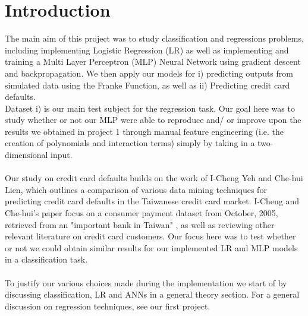 \documentclass[10pt, a4paper, twocolumn]{article}
\begin{document}

\twocolumn[
\begin{@twocolumnfalse}
	\maketitle
	\begin{abstract}
		\abstractText
		\newline
		\newline
	\end{abstract}
\end{@twocolumnfalse}
]


\section{Introduction}
	The main aim of this project was to study classification and regressions problems, including implementing Logistic Regression (LR) as well as implementing and training a Multi Layer Perceptron (MLP) Neural Network using gradient descent and backpropagation. We then apply our models for i) predicting outputs from simulated data using the Franke Function, as well as ii) Predicting credit card defaults.\\ 
	Dataset i) is our main test subject for the regression task. Our goal here was to study whether or not our MLP were able to reproduce and/ or improve upon the results we obtained in project 1 through manual feature engineering (i.e. the creation of polynomials and interaction terms) simply by taking in a two-dimensional input.\\\\
	Our study on credit card defaults builds on the work of I-Cheng Yeh and Che-hui Lien\cite{ScientificArticle}, which outlines a comparison of various data mining techniques for predicting credit card defaults in the Taiwanese credit card market. I-Cheng and Che-hui's paper focus on a consumer payment dataset from October, 2005, retrieved from an "important bank in Taiwan" \cite{ScientificArticle}, as well as reviewing other relevant literature on credit card customers. Our focus here was to test whether or not we could obtain similar results for our implemented LR and MLP models in a classification task.\\\\
	To justify our various choices made during the implementation we start of by discussing classification, LR and ANNs in a general theory section. For a general discussion on regression techniques, see our first project\cite{Project1}.
\end{document}
